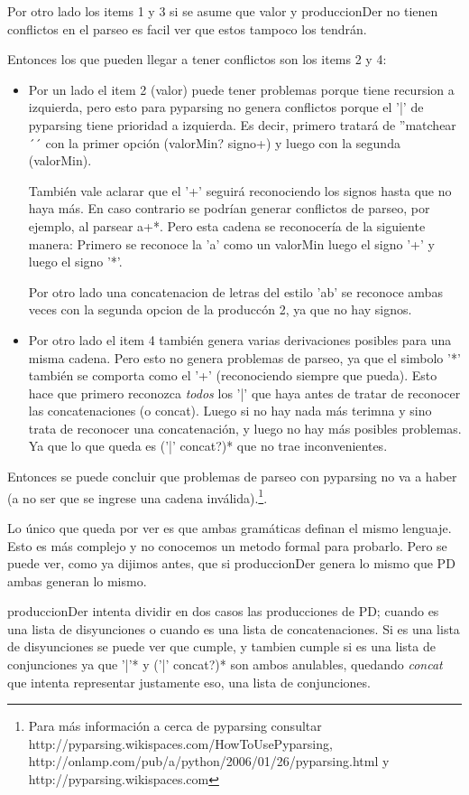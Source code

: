 \documentclass[a4paper]{report}
\begin{document}
Por otro lado los items 1 y 3 si se asume que valor y produccionDer no tienen conflictos en el parseo es facil ver que estos tampoco los tendrán.

Entonces los que pueden llegar a tener conflictos son los items 2 y 4:
\begin{itemize}
\item Por un lado el item 2 (valor) puede tener problemas porque tiene recursion a izquierda, pero esto para pyparsing no genera conflictos porque el '|' de pyparsing tiene prioridad a izquierda. Es decir, primero tratará de ''matchear´´ con la primer opción (valorMin? signo+) y luego con la segunda (valorMin).

También vale aclarar que el '+' seguirá reconociendo los signos hasta que no haya más. En caso contrario se podrían generar conflictos de parseo, por ejemplo, al parsear a+*. Pero esta cadena se reconocería de la siguiente manera:
\subitem Primero se reconoce la 'a' como un valorMin
\subitem luego el signo '+'
\subitem y luego el signo '*'.

Por otro lado una concatenacion de letras del estilo 'ab' se reconoce ambas veces con la segunda opcion de la produccón 2, ya que no hay signos.
\item Por otro lado el item 4 también genera varias derivaciones posibles para una misma cadena. Pero esto no genera problemas de parseo, ya que el simbolo '*' también se comporta como el '+' (reconociendo siempre que pueda). Esto hace que primero reconozca \emph{todos} los '|' que haya antes de tratar de reconocer las concatenaciones (o concat). Luego si no hay nada más terimna y sino trata de reconocer una concatenación, y luego no hay más posibles problemas. Ya que lo que queda es ('|' concat?)* que no trae inconvenientes.
\end{itemize}

Entonces se puede concluir que problemas de parseo con pyparsing no va a haber (a no ser que se ingrese una cadena inválida).\footnote{Para más información a cerca de pyparsing consultar http://pyparsing.wikispaces.com/HowToUsePyparsing, http://onlamp.com/pub/a/python/2006/01/26/pyparsing.html y http://pyparsing.wikispaces.com }.

Lo único que queda por ver es que ambas gramáticas definan el mismo lenguaje. Esto es más complejo y no conocemos un metodo formal para probarlo. Pero se puede ver, como ya dijimos antes, que si produccionDer genera lo mismo que PD ambas generan lo mismo.

produccionDer intenta dividir en dos casos las producciones de PD; cuando es una lista de disyunciones o cuando es una lista de concatenaciones. Si es una lista de disyunciones se puede ver que cumple, y tambien cumple si es una lista de conjunciones ya que '|'* y ('|' concat?)* son ambos anulables, quedando \emph{concat} que intenta representar justamente eso, una lista de conjunciones.
\end{document}
